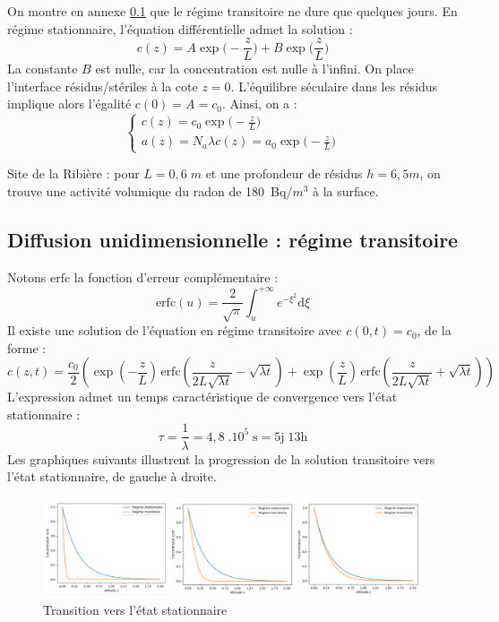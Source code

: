 \documentclass{article}
\begin{document}
On montre en annexe \ref{annexe:reg_trans} que le régime transitoire ne dure que quelques jours. En régime stationnaire, l’équation différentielle admet la solution :
$$
c(z)=A \exp \Big(-\frac{z}{L} \Big)+B \exp \Big( \frac{z}{L} \Big)
$$
La constante $B$ est nulle, car la concentration est nulle à l’infini. On place l’interface résidus/stériles à la cote $z=0$. L’équilibre séculaire dans les résidus implique alors l’égalité $c(0)=A=c_0$. Ainsi, on a :
$$
\left\{ \begin{array}{cl}
c(z)=c_0 \exp\Big(-\frac{z}{L}\Big) \\
a(z)=N_a \lambda c(z) =a_0 \exp\Big(-\frac{z}{L}\Big)
\end{array} \right.
$$

Site de la Ribière : pour $L=0,6 \; m$ et une profondeur de résidus $h=6,5 m$, on trouve une activité volumique du radon de 180~Bq/$m^3$ à la surface.

\subsection{Diffusion unidimensionnelle : régime transitoire}
\label{annexe:reg_trans}

Notons $\text{erfc}$ la fonction d’erreur complémentaire :
$$
\text{erfc}(u)=\frac{2}{\sqrt{\pi}} \int_{u}^{+\infty } e^{-\xi^2} \text{d}\xi
$$
Il existe une solution de l’équation en régime transitoire avec $c(0,t)=c_0$, de la forme :
$$
c(z,t)=\frac{c_0}{2} \left( \exp\!\left(-\frac{z}{L}\right) \, \text{erfc}\!\left(\frac{z}{2L\sqrt{ \lambda t}} - \sqrt{\lambda t}\right) + \exp\!\left(\frac{z}{L}\right) \, \text{erfc}\!\left(\frac{z}{2L\sqrt{\lambda t}} + \sqrt{\lambda t} \right) \right)
$$
L’expression admet un temps caractéristique de convergence vers l’état stationnaire :
$$
\tau=\frac{1}{\lambda}=4,8 \; .10^5 \; \text{s}=5\text{j} \; 13\text{h}
$$
Les graphiques suivants illustrent la progression de la solution transitoire vers l'état stationnaire, de gauche à droite.
\begin{figure}[H]
    \centering
    \includegraphics[width = \linewidth]{III_C_3.png}
    \caption{Transition vers l'état stationnaire}
    \label{fig:diffusion_transitoire}
\end{figure}
\end{document}
